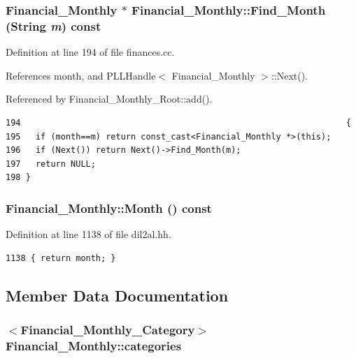 \subsubsection{\setlength{\rightskip}{0pt plus 5cm}Financial\_\-Monthly $\ast$ Financial\_\-Monthly::Find\_\-Month ({\bf String} {\em m}) const}\label{classFinancial__Monthly_a2}




Definition at line 194 of file finances.cc.

References month, and PLLHandle$<$ Financial\_\-Monthly $>$::Next().

Referenced by Financial\_\-Monthly\_\-Root::add().



\footnotesize\begin{verbatim}194                                                                 {
195   if (month==m) return const_cast<Financial_Monthly *>(this);
196   if (Next()) return Next()->Find_Month(m);
197   return NULL;
198 }
\end{verbatim}\normalsize 
{}
\subsubsection{ Financial\_\-Monthly::Month () const\hspace{0.3cm}{\tt  [inline]}}\label{classFinancial__Monthly_a1}




Definition at line 1138 of file dil2al.hh.



\footnotesize\begin{verbatim}1138 { return month; }
\end{verbatim}\normalsize 


\subsection{Member Data Documentation}
\subsubsection{$<${\bf Financial\_\-Monthly\_\-Category}$>$ Financial\_\-Monthly::categories}\label{classFinancial__Monthly_m0}




